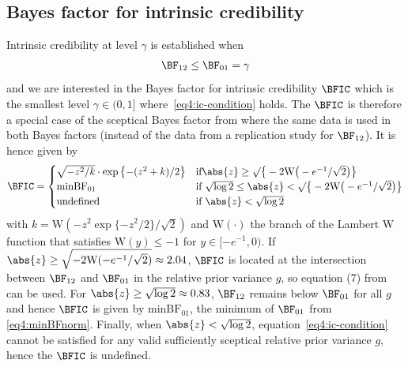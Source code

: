 \begin{subappendices}
\section{Bayes factor for intrinsic credibility}
\label{app:BFIC}
Intrinsic credibility at level $\gamma$ is established when
\begin{align}
  \label{eq4:ic-condition}
  \BF_{12} \leq \BF_{01} = \gamma
\end{align}
and we are interested in the Bayes factor for intrinsic credibility $\BFIC$
which is the smallest level $\gamma \in (0, 1]$ where~\eqref{eq4:ic-condition}
holds. The $\BFIC$ is therefore a special case of the sceptical Bayes factor
from \citet{Pawel2020b} where the same data is used in both Bayes factors
(instead of the data from a replication study for $\BF_{12}$). It is hence given
by
\begin{align}
  \label{eq4:BFic}
  \BFIC =
  \begin{cases}
    \sqrt{-z^{2}/k}\cdot \exp\left\{-(z^{2} + k)/2\right\}
    & \text{if} \abs{z} \geq \surd\big\{-2 \mathrm{W}\big(-e^{-1}/\sqrt2\big)\big\}\\
    \mbox{minBF}_{01} \
    & \text{if} ~ \sqrt{\log 2} \leq \abs{z} < \surd\big\{-2 \mathrm{W}\big(-e^{-1}/\sqrt2\big)\big\} \\
    \text{undefined}
    & \text{if} ~ \abs{z} < \sqrt{\log 2}
  \end{cases}
\end{align}
with $k = \mathrm{W}(-z^{2} \exp\{-z^{2}/2\}/\sqrt{2})$ and $\mathrm{W}(\cdot)$
the branch of the Lambert W function that satisfies $\mathrm{W}(y) \leq -1$ for
$y \in [-e^{-1}, 0).$ If
$\abs{z} \geq \sqrt{-2 \mathrm{W}(-e^{-1}/\sqrt2)} \approx 2.04$, $\BFIC$ is
located at the intersection between $\BF_{12}$ and $\BF_{01}$ in the relative
prior variance $g$, so equation (7) from \citet{Pawel2020b} can be used. For
$\abs{z} \geq \sqrt{\log 2} \approx 0.83$, $\BF_{12}$ remains below $\BF_{01}$
for all $g$ and hence $\BFIC$ is given by $\mbox{minBF}_{01}$, the minimum of
$\BF_{01}$ from \eqref{eq4:minBFnorm}. Finally, when $\abs{z} < \sqrt{\log 2}$,
equation~\eqref{eq4:ic-condition} cannot be satisfied for any valid sufficiently
sceptical relative prior variance $g$, hence the $\BFIC$ is undefined.

\end{subappendices}



